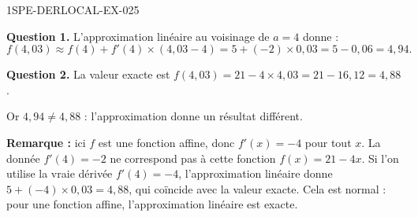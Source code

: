 \begin{corrige}{1SPE-DERLOCAL-EX-025}

\textbf{Question 1.} L'approximation linéaire au voisinage de $a = 4$ donne :
\[
f(4{,}03) \approx f(4) + f'(4) \times (4{,}03 - 4) = 5 + (-2) \times 0{,}03 = 5 - 0{,}06 = \boxed{4{,}94}.
\]

\textbf{Question 2.} La valeur exacte est $f(4{,}03) = 21 - 4 \times 4{,}03 = 21 - 16{,}12 = 4{,}88$.

\medskip
Or $4{,}94 \neq 4{,}88$ : l'approximation donne un résultat différent.

\textbf{Remarque :} ici $f$ est une fonction affine, donc $f'(x) = -4$ pour tout $x$. La donnée $f'(4) = -2$ ne correspond pas à cette fonction $f(x) = 21 - 4x$. Si l'on utilise la vraie dérivée $f'(4) = -4$, l'approximation linéaire donne $5 + (-4) \times 0{,}03 = 4{,}88$, qui coïncide avec la valeur exacte. Cela est normal : pour une fonction affine, l'approximation linéaire est exacte.

\end{corrige}
